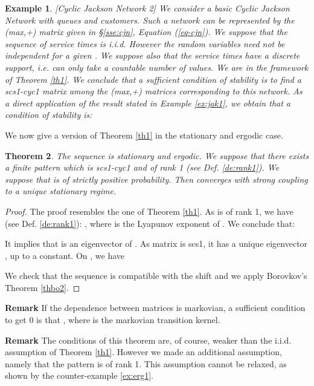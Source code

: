 \documentclass[11pt,titlepage]{article}
\newcommand{\parag}{\medskip\noindent}
\newtheorem{theo}{Theorem }[section]
\newtheorem{example}[theo]{Example }
\newenvironment{exam}{\begin{example}\rm}{\end{example}}
\begin{document}
\begin{exam}[Cyclic Jackson Network 2] 
We consider a basic Cyclic Jackson Network with  queues and  customers.
Such a 
network can be represented by the (max,+) matrix given in \S \ref{sse:cjn},
Equation (\ref{eq-cjn}).
We suppose that the sequence of  service times
 is i.i.d.  
However the random variables
 need not be independent for a given . 
We suppose also that the service times have a discrete support, i.e. can only
take a countable number of values. We are in the framework of Theorem
\ref{th1}. 
We conclude that a sufficient condition of stability is to find a scs1-cyc1
matrix among the (max,+) matrices corresponding to this network.
As a direct application of the result stated in Example
\ref{ex:jak1}, we obtain that a condition of stability is:

\label{ex:jak2}
\end{exam}

\parag
We now give a version of Theorem \ref{th1} in the stationary and
ergodic case. 

\begin{theo}
\label{th2}
The sequence  is stationary and ergodic. We suppose that
there 
exists a finite pattern 
 which is 
scs1-cyc1 and of rank 1 (see Def. \ref{de:rank1}). 
We suppose that  is of strictly positive probability.
Then  converges with
strong coupling to a unique stationary regime.
\end{theo}

\begin {proof}
The proof resembles the one of Theorem
\ref{th1}. As  is of rank 1, we
have (see 
Def. \ref{de:rank1}): , where  is the Lyapunov
exponent 
of . We conclude that:

It implies that  is an eigenvector of . As matrix  is scs1, it has a
unique eigenvector , up to a constant. On , 
we have 

We check that the sequence  is compatible with the shift and we
apply Borovkov's Theorem \ref{thbo2}. 
\end {proof} 

{\bf Remark} If the dependence between matrices is markovian, a
sufficient 
condition to get  0 is that 
, where  is the
markovian 
transition kernel.

\parag
{\bf Remark} The conditions of this theorem are, of course, weaker than the
i.i.d. 
assumption of Theorem \ref{th1}. However we made an
additional assumption, namely that the pattern  is of rank 1. This
assumption cannot be relaxed, as
shown by the
counter-example \ref{ex:erg1}.
\end{document}
